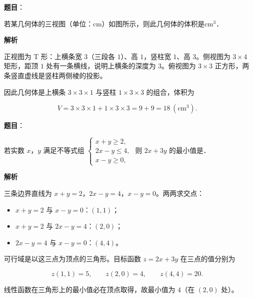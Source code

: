 \begin{answer}

\textbf{题目}：

若某几何体的三视图（单位：cm）如图所示，则此几何体的体积是\gkblank{}$\mathrm{cm^3}$．
\nopagebreak[4]
\begin{center}\end{center}
\nopagebreak[4]
\textbf{解析}

正视图为 T 形：上横条宽 $3$（三段各 $1$）、高 $1$，竖柱宽 $1$、高 $3$。侧视图为 $3\times4$ 矩形，距顶 $1$ 处有一条横线，说明上横条的深度为 $3$。俯视图为 $3\times3$ 正方形，两条竖直虚线是竖柱两侧棱的投影。

因此几何体是上横条 $3\times3\times1$ 与竖柱 $1\times3\times3$ 的组合，体积为

\nopagebreak[4]
\[V=3\times3\times1+1\times3\times3=9+9=18\ (\mathrm{cm^3}).\]


\end{answer}
\begin{answer}

\textbf{题目}：

若实数 $x$，$y$ 满足不等式组 $\begin{cases}x+y\geqslant2,\\2x-y\leqslant4,\\x-y\geqslant0,\end{cases}$ 则 $2x+3y$ 的最小值是\gkblank{}．

\textbf{解析}

三条边界直线为 $x+y=2$，$2x-y=4$，$x-y=0$。两两求交点：

\begin{itemize}
\item $x+y=2$ 与 $x-y=0$：$(1,1)$；
\item $x+y=2$ 与 $2x-y=4$：$(2,0)$；
\item $2x-y=4$ 与 $x-y=0$：$(4,4)$。
\end{itemize}

可行域是以这三点为顶点的三角形。目标函数 $z=2x+3y$ 在三点的值分别为

\nopagebreak[4]
\[z(1,1)=5,\qquad z(2,0)=4,\qquad z(4,4)=20.\]

线性函数在三角形上的最小值必在顶点取得，故最小值为 $4$（在 $(2,0)$ 处）。


\end{answer}

